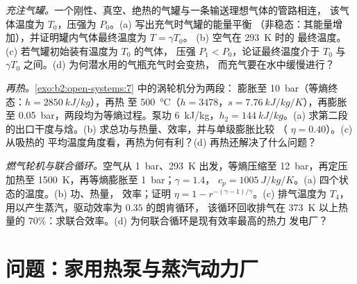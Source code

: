 \begin{exercise}[$\star\star\star$]\label{exo:b2:open-systems:10}
\emph{充注气罐。}一个刚性、真空、绝热的气罐与一条输送理想气体的管路相连，
该气体温度为 $T_0$，压强为 $P_0$。(a) 写出充气时气罐的能量平衡
（非稳态：其能量增加），并证明罐内气体最终温度为 $T = \gamma T_0$。
(b) 空气在 \qty{293}{K} 时的
最终温度。(c) 若气罐初始装有温度为 $T_0$ 的气体，
压强 $P_1 < P_0$，论证最终温度介于 $T_0$ 与
$\gamma T_0$ 之间。(d) 为何潜水用的气瓶充气时会变热，
而充气要在水中缓慢进行？
\end{exercise}

\begin{exercise}[$\star\star\star$]\label{exo:b2:open-systems:11}
\emph{再热。}\cref{exo:b2:open-systems:7} 中的涡轮机分为两段：
膨胀至 \qty{10}{bar}（等熵终态：$h = \qty{2850}{kJ/kg}$），再热
至 \qty{500}{\celsius}（$h = 3478$，$s = \qty{7.76}{kJ/kg/K}$），再膨胀
至 \qty{0.05}{bar}，两段均为等熵过程。泵功 \qty{6}{kJ/kg}，$h_2 =
\qty{144}{kJ/kg}$。(a) 求第二段的出口干度与焓。(b)
求总功与热量、效率，并与单级膨胀比较
（ $\eta = 0.40$）。(c) 从吸热的
平均温度角度看，再热为何有利？(d) 再热还解决了什么问题？
\end{exercise}

\begin{exercise}[$\star\star\star$]\label{exo:b2:open-systems:12}
\emph{燃气轮机与联合循环。}空气从
\qty{1}{bar}、\qty{293}{K} 出发，等熵压缩至 \qty{12}{bar}，再定压
加热至 \qty{1500}{K}，再等熵膨胀至 \qty{1}{bar}；$\gamma = 1.4$，
$c_p = \qty{1005}{J/kg/K}$。(a) 四个状态的温度。(b) 功、热量，
效率；证明 $\eta = 1 - r^{-(\gamma - 1)/\gamma}$。(c)
排气温度为 $T_4$，用以产生蒸汽，驱动效率为 $0.35$ 的朗肯循环，
该循环回收排气在 \qty{373}{K} 以上热量的 $70\%$：求联合效率。(d)
为何联合循环是现有效率最高的热力
发电厂？
\end{exercise}

\section{问题：家用热泵与蒸汽动力厂}

